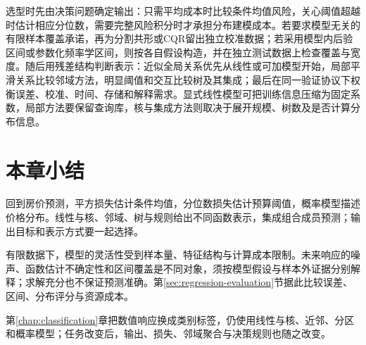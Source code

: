 选型时先由决策问题确定输出：只需平均成本时比较条件均值风险，关心阈值超越时估计相应分位数，需要完整风险积分时才承担分布建模成本。若要求模型无关的有限样本覆盖承诺，再为分割共形或CQR留出独立校准数据；若采用模型内后验区间或参数化频率学区间，则按各自假设构造，并在独立测试数据上检查覆盖与宽度。随后用残差结构判断表示：近似全局关系优先从线性或可加模型开始，局部平滑关系比较邻域方法，明显阈值和交互比较树及其集成；最后在同一验证协议下权衡误差、校准、时间、存储和解释需求。显式线性模型可把训练信息压缩为固定系数，局部方法要保留查询库，核与集成方法则取决于展开规模、树数及是否计算分布信息。

\section{本章小结}
\label{sec:regression-summary}

回到房价预测，平方损失估计条件均值，分位数损失估计预算阈值，概率模型描述价格分布。线性与核、邻域、树与规则给出不同函数表示，集成组合成员预测；输出目标和表示方式要一起选择。

有限数据下，模型的灵活性受到样本量、特征结构与计算成本限制。未来响应的噪声、函数估计不确定性和区间覆盖是不同对象，须按模型假设与样本外证据分别解释；求解充分也不保证预测准确。第\ref{sec:regression-evaluation}节据此比较误差、区间、分布评分与资源成本。

第\ref{chap:classification}章把数值响应换成类别标签，仍使用线性与核、近邻、分区和概率模型；任务改变后，输出、损失、邻域聚合与决策规则也随之改变。
